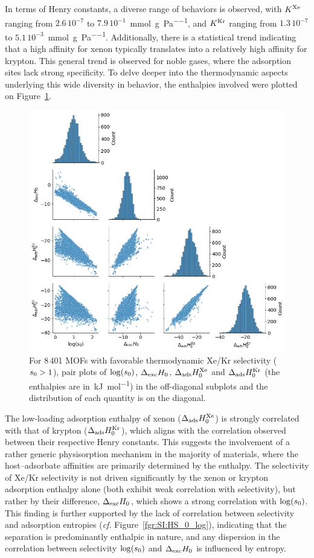 \documentclass[main.tex]{subfiles}
\begin{document}
In terms of Henry constants, a diverse range of behaviors is observed, with $K^{\text{Xe}}$ ranging from $2.6\,10^{-7}$ to $7.9\,10^{-1}$~\si{\milli\mole\per\gram\per\pascal}, and $K^{\text{Kr}}$ ranging from $1.3\,10^{-7}$ to $5.1\,10^{-3}$~\si{\milli\mole\per\gram\per\pascal}.  Additionally, there is a statistical trend indicating that a high affinity for xenon typically translates into a relatively high affinity for krypton. This general trend is observed for noble gases, where the adsorption sites lack strong specificity. To delve deeper into the thermodynamic aspects underlying this wide diversity in behavior, the enthalpies involved were plotted on Figure~\ref{fgr:histo_H}.

\begin{figure}[t]
\centering
  \includegraphics[width=0.7\linewidth]{figures/2-thermo/Enthalpy_0_log.jpg}
  \caption{For 8\,401 MOFs with favorable thermodynamic Xe/Kr selectivity ($s_{\text{0}} > 1$), pair plots of $\log(s_{\text{0}})$, $\Delta_{\text{exc}}H_{\text{0}}$, $\Delta_{\text{ads}}H^{\text{Xe}}_{\text{0}}$ and $\Delta_{\text{ads}}H^{\text{Kr}}_{\text{0}}$ (the enthalpies are in~\si{\kilo\joule\per\mol}) in the off-diagonal subplots and the distribution of each quantity is on the diagonal.}\label{fgr:histo_H}
\end{figure}

The low-loading adsorption enthalpy of xenon ($\Delta_{\text{ads}}H^{\text{Xe}}_{\text{0}}$) is strongly correlated with that of krypton ($\Delta_{\text{ads}}H^{\text{Kr}}_{\text{0}}$), which aligns with the correlation observed between their respective Henry constants. This suggests the involvement of a rather generic physisorption mechanism in the majority of materials, where the host--adsorbate affinities are primarily determined by the enthalpy. The selectivity of Xe/Kr selectivity is not driven significantly by the xenon or krypton adsorption enthalpy alone (both exhibit weak correlation with selectivity), but rather by their difference, $\Delta_{\text{exc}}H_{\text{0}}$, which shows a strong correlation with $\log(s_{\text{0}})$. This finding is further supported by the lack of correlation between selectivity and adsorption entropies (\emph{cf.} Figure~\ref{fgr:SI:HS_0_log}), indicating that the separation is predominantly enthalpic in nature, and any dispersion in the correlation between selectivity $\log(s_{\text{0}})$ and $\Delta_{\text{exc}}H_{\text{0}}$ is influenced by entropy.
\end{document}
